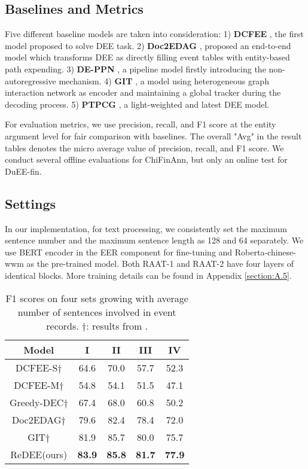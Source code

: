 \documentclass[11pt]{article}
\begin{document}
\subsection{Baselines and Metrics}
Five different baseline models are taken into consideration: 1) \textbf{DCFEE} \cite{DCFEE}, the first model proposed to solve DEE task. 2) \textbf{Doc2EDAG} \cite{Doc2EDAG}, proposed an end-to-end model which transforms DEE as directly filling event tables with entity-based path expending. 3) \textbf{DE-PPN} \cite{DE-PPN}, a pipeline model firstly introducing the non-autoregressive mechanism. 4) \textbf{GIT} \cite{GIT}, a model using heterogeneous graph interaction network as encoder and maintaining a global tracker during the decoding process. 5) \textbf{PTPCG} \cite{PTPCG}, a light-weighted and latest DEE model. 

For evaluation metrics, we use precision, recall, and F1 score at the entity argument level for fair comparison with baselines. The overall "Avg" in the result tables denotes the micro average value of precision, recall, and F1 score. We conduct several offline evaluations for ChiFinAnn, but only an online test for DuEE-fin. 


\subsection{Settings}

In our implementation, for text processing, we consistently set the maximum sentence number and the maximum sentence length as 128 and 64 separately. We use BERT encoder in the EER component for fine-tuning and Roberta-chinese-wwm \cite{prtrainedModel} as the pre-trained model. Both RAAT-1 and RAAT-2 have four layers of identical blocks. More training details can be found in Appendix \ref{section:A.5}.
\begin{table}
\centering\small
\begin{tabular}{c|c|c|c|c}
\hline
\hline
\textbf{Model} & \textbf{I} & \textbf{II} & \textbf{III} & \textbf{IV} \\ 
\hline
DCFEE-S$\dag$ & 64.6 & 70.0 & 57.7 & 52.3 \\
DCFEE-M$\dag$ & 54.8 & 54.1 & 51.5 & 47.1 \\
Greedy-DEC$\dag$ & 67.4 & 68.0 & 60.8 & 50.2 \\
Doc2EDAG$\dag$ & 79.6 & 82.4 & 78.4 & 72.0 \\
GIT$\dag$ & 81.9 & 85.7 & 80.0 & 75.7 \\
\hline
ReDEE(ours) & \textbf{83.9} & \textbf{85.8} & \textbf{81.7} & \textbf{77.9} \\
\hline
\hline
\end{tabular}
\caption{F1 scores on four sets growing with average number of sentences involved in event records. $\dag$: results from \cite{GIT}.}
\label{tab:across-sentence}
\end{table}
\end{document}
